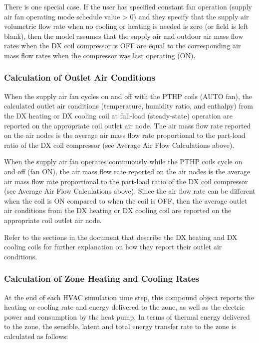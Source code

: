 There is one special case. If the user has specified constant fan operation (supply air fan operating mode schedule value \textgreater{} 0) and they specify that the supply air volumetric flow rate when no cooling or heating is needed is zero (or field is left blank), then the model assumes that the supply air and outdoor air mass flow rates when the DX coil compressor is OFF are equal to the corresponding air mass flow rates when the compressor was last operating (ON).

\subsubsection{Calculation of Outlet Air Conditions}\label{calculation-of-outlet-air-conditions-1}

When the supply air fan cycles on and off with the PTHP coils (AUTO fan), the calculated outlet air conditions (temperature, humidity ratio, and enthalpy) from the DX heating or DX cooling coil at full-load (steady-state) operation are reported on the appropriate coil outlet air node. The air mass flow rate reported on the air nodes is the average air mass flow rate proportional to the part-load ratio of the DX coil compressor (see Average Air Flow Calculations above).

When the supply air fan operates continuously while the PTHP coils cycle on and off (fan ON), the air mass flow rate reported on the air nodes is the average air mass flow rate proportional to the part-load ratio of the DX coil compressor (see Average Air Flow Calculations above). Since the air flow rate can be different when the coil is ON compared to when the coil is OFF, then the average outlet air conditions from the DX heating or DX cooling coil are reported on the appropriate coil outlet air node.

Refer to the sections in the document that describe the DX heating and DX cooling coils for further explanation on how they report their outlet air conditions.

\subsubsection{Calculation of Zone Heating and Cooling Rates}\label{calculation-of-zone-heating-and-cooling-rates-1}

At the end of each HVAC simulation time step, this compound object reports the heating or cooling rate and energy delivered to the zone, as well as the electric power and consumption by the heat pump. In terms of thermal energy delivered to the zone, the sensible, latent and total energy transfer rate to the zone is calculated as follows:

